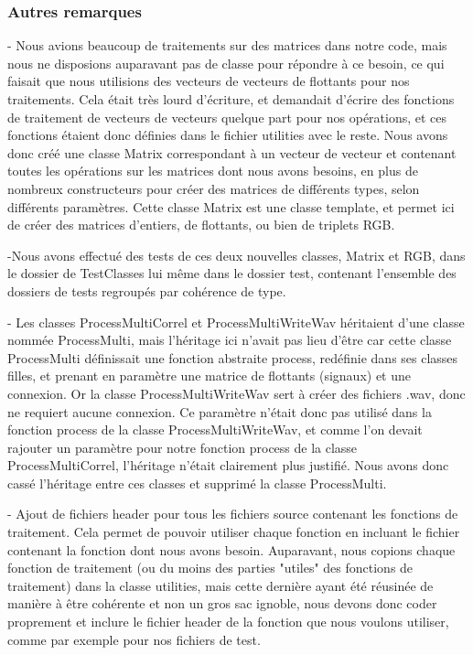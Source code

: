\subsubsection{Autres remarques}
  

  - Nous avions beaucoup de traitements sur des matrices dans notre code, mais
  nous ne disposions auparavant pas de classe pour répondre à ce besoin, ce qui
  faisait que nous utilisions des vecteurs de vecteurs de flottants pour nos
  traitements. Cela était très lourd d'écriture, et demandait d'écrire des
  fonctions de traitement de vecteurs de vecteurs quelque part pour nos
  opérations, et ces fonctions étaient donc définies dans le fichier utilities
  avec le reste. Nous avons donc créé une classe Matrix correspondant à un
  vecteur de vecteur et contenant toutes les opérations sur les matrices dont
  nous avons besoins, en plus de nombreux constructeurs pour créer des matrices
  de différents types, selon différents paramètres. Cette classe Matrix est une
  classe template, et permet ici de créer des matrices d'entiers, de flottants,
  ou bien de triplets RGB.

  -Nous avons effectué des tests de ces deux nouvelles classes, Matrix et RGB,
  dans le dossier de TestClasses lui même dans le dossier test, contenant
  l'ensemble des dossiers de tests regroupés par cohérence de type.

  - Les classes ProcessMultiCorrel et ProcessMultiWriteWav héritaient d'une
  classe nommée ProcessMulti, mais l'héritage ici n'avait pas lieu d'être car
  cette classe ProcessMulti définissait une fonction abstraite process,
  redéfinie dans ses classes filles, et prenant en paramètre une matrice de
  flottants (signaux) et une connexion. Or la classe ProcessMultiWriteWav sert
  à créer des fichiers .wav, donc ne requiert aucune connexion. Ce paramètre
  n'était donc pas utilisé dans la fonction process de la classe
  ProcessMultiWriteWav, et comme l'on devait rajouter un paramètre pour notre
  fonction process de la classe ProcessMultiCorrel, l'héritage n'était
  clairement plus justifié. Nous avons donc cassé l'héritage entre ces classes
  et supprimé la classe ProcessMulti.

  - Ajout de fichiers header pour tous les fichiers source contenant les
  fonctions de traitement. Cela permet de pouvoir utiliser chaque fonction en
  incluant le fichier contenant la fonction dont nous avons besoin. Auparavant,
  nous copions chaque fonction de traitement (ou du moins des parties "utiles"
  des fonctions de traitement) dans la classe utilities, mais cette dernière
  ayant été réusinée de manière à être cohérente et non un gros sac ignoble,
  nous devons donc coder proprement et inclure le fichier header de la fonction
  que nous voulons utiliser, comme par exemple pour nos fichiers de test.

